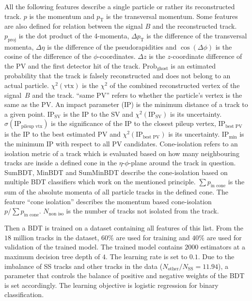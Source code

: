 All the following features describe a single particle or rather its reconstructed track.
%
$p$ is the momentum and
$p_\text{T}$ is the transversal momentum. 
%
Some features are also defined for relation between the signal $B$ and the reconstructed track. 
$p_\text{proj}$ is the dot product of the 4-momenta,
$\Delta p_\text{T}$ is the difference of the transversal momenta,    
$\Delta \eta$ is the difference of the pseudorapidities and   
$\cos(\Delta \phi)$ is the cosine of the difference of the $\phi$-coordinates. 
$\Delta z$ is the $z$-coordinate difference of the PV and the first detector hit of the track. 
%  
$\text{Prob}_\text{ghost}$ is an estimated probability that the track is falsely reconstructed and does not belong to an actual particle. 
$\chi^2(\text{vtx})$ is the $\chi^2$ of the combined reconstructed vertex of the signal~$B$ and the track. 
\enquote{same PV} refers to whether the particle's vertex is the same as the PV.
%
An impact parameter (IP) is the minimum distance of a track to a given point.
$\text{IP}_\text{SV}$ is the IP to the SV and  
$\chi^2(\text{IP}_\text{SV})$ is its uncertainty.
$\sigma(\text{IP}_\text{pileup vtx})$ is the significance of the IP to the closest pileup vertex,
$\text{IP}_\text{best PV}$ is the IP to the best estimated PV and  
$\chi^2(\text{IP}_\text{best PV})$ is its uncertainty.
$\text{IP}_\text{min}$ is the minimum IP with respect to all PV candidates.
%
Cone-isolation refers to an isolation metric of a track which is evaluated based on how many neighbouring tracks are inside a defined cone in the $\eta$-$\phi$-plane around the track in question. %
SumBDT,    
MinBDT and    
SumMinBDT describe the cone-isolation based on multiple BDT classifiers which work on the mentioned principle.
$\sum p_\text{in cone}$ is the sum of the absolute momenta of all particle tracks in the defined cone.
The feature \enquote{cone isolation} describes the momentum based cone-isolation $p/\sum p_\text{in cone}$. 
$N_\text{non iso}$ is the number of tracks not isolated from the track.   

Then a BDT is trained on a dataset containing all features of this list.
From the $18$ million tracks in the dataset, $60\%$ are used for training and $40\%$ are used for validation of the trained model.
The trained model contains $2000$ estimators at a maximum decision tree depth of $4$.
The learning rate is set to $0.1$.
Due to the imbalance of SS tracks and other tracks in the data ($N_\text{other}/N_\text{SS} = 11.94$), a parameter that controls the balance of positive and negative weights of the BDT is set accordingly. 
The learning objective is logistic regression for binary classification.

